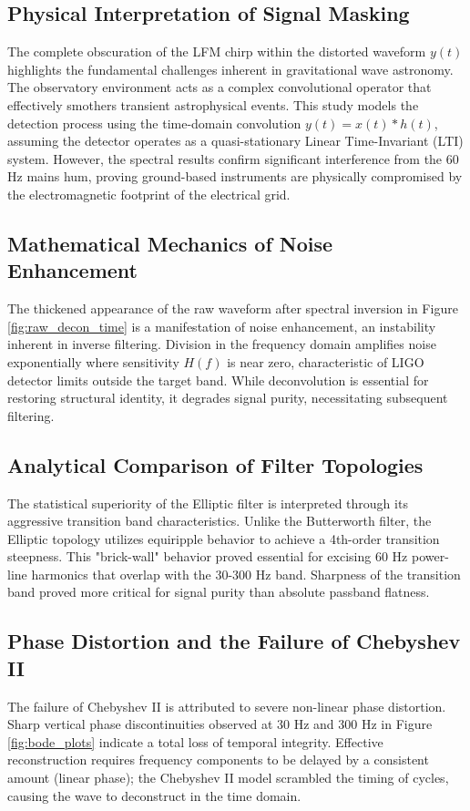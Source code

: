 \subsection{Physical Interpretation of Signal Masking}
The complete obscuration of the LFM chirp within the distorted waveform $y(t)$ highlights the fundamental challenges inherent in gravitational wave astronomy. The observatory environment acts as a complex convolutional operator that effectively smothers transient astrophysical events. This study models the detection process using the time-domain convolution $y(t)=x(t)*h(t)$, assuming the detector operates as a quasi-stationary Linear Time-Invariant (LTI) system. However, the spectral results confirm significant interference from the 60 Hz mains hum, proving ground-based instruments are physically compromised by the electromagnetic footprint of the electrical grid.

\subsection{Mathematical Mechanics of Noise Enhancement}
The thickened appearance of the raw waveform after spectral inversion in Figure \ref{fig:raw_decon_time} is a manifestation of noise enhancement, an instability inherent in inverse filtering. Division in the frequency domain amplifies noise exponentially where sensitivity $H(f)$ is near zero, characteristic of LIGO detector limits outside the target band. While deconvolution is essential for restoring structural identity, it degrades signal purity, necessitating subsequent filtering.

\subsection{Analytical Comparison of Filter Topologies}
The statistical superiority of the Elliptic filter is interpreted through its aggressive transition band characteristics. Unlike the Butterworth filter, the Elliptic topology utilizes equiripple behavior to achieve a 4th-order transition steepness. This "brick-wall" behavior proved essential for excising 60 Hz power-line harmonics that overlap with the 30-300 Hz band. Sharpness of the transition band proved more critical for signal purity than absolute passband flatness.

\subsection{Phase Distortion and the Failure of Chebyshev II}
The failure of Chebyshev II is attributed to severe non-linear phase distortion. Sharp vertical phase discontinuities observed at 30 Hz and 300 Hz in Figure \ref{fig:bode_plots} indicate a total loss of temporal integrity. Effective reconstruction requires frequency components to be delayed by a consistent amount (linear phase); the Chebyshev II model scrambled the timing of cycles, causing the wave to deconstruct in the time domain.

